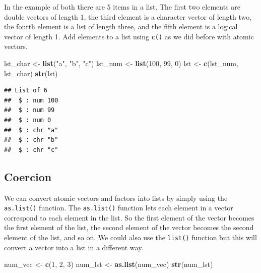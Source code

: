 \documentclass[
]{book}
\newenvironment{Shaded}{\begin{snugshade}}{\end{snugshade}}
\newcommand{\DecValTok}[1]{\textcolor[rgb]{0.00,0.00,0.81}{#1}}
\newcommand{\KeywordTok}[1]{\textcolor[rgb]{0.13,0.29,0.53}{\textbf{#1}}}
\newcommand{\NormalTok}[1]{#1}
\newcommand{\StringTok}[1]{\textcolor[rgb]{0.31,0.60,0.02}{#1}}
\begin{document}
In the example of both there are 5 items in a list. The first two elements are double vectors of length 1, the third element is a character vector of length two, the fourth element is a list of length three, and the fifth element is a logical vector of length 1.
Add elements to a list using \texttt{c()} as we did before with atomic vectors.

\begin{Shaded}
\begin{Highlighting}[]
\NormalTok{lst_char <-}\StringTok{ }\KeywordTok{list}\NormalTok{(}\StringTok{"a"}\NormalTok{, }\StringTok{"b"}\NormalTok{, }\StringTok{"c"}\NormalTok{)}
\NormalTok{lst_num <-}\StringTok{ }\KeywordTok{list}\NormalTok{(}\DecValTok{100}\NormalTok{, }\DecValTok{99}\NormalTok{, }\DecValTok{0}\NormalTok{)}
\NormalTok{lst <-}\StringTok{ }\KeywordTok{c}\NormalTok{(lst_num, lst_char)}
\KeywordTok{str}\NormalTok{(lst)}
\end{Highlighting}
\end{Shaded}

\begin{verbatim}
## List of 6
##  $ : num 100
##  $ : num 99
##  $ : num 0
##  $ : chr "a"
##  $ : chr "b"
##  $ : chr "c"
\end{verbatim}

\hypertarget{coercion-2}{%
\subsection{Coercion}\label{coercion-2}}

We can convert atomic vectors and factors into lists by simply using the \texttt{as.list()} function. The \texttt{as.list()} function lets each element in a vector correspond to each element in the list. So the first element of the vector becomes the first element of the list, the second element of the vector becomes the second element of the list, and so on. We could also use the \texttt{list()} function but this will convert a vector into a list in a different way.

\begin{Shaded}
\begin{Highlighting}[]
\NormalTok{num_vec <-}\StringTok{ }\KeywordTok{c}\NormalTok{(}\DecValTok{1}\NormalTok{, }\DecValTok{2}\NormalTok{, }\DecValTok{3}\NormalTok{)}
\NormalTok{num_lst <-}\StringTok{ }\KeywordTok{as.list}\NormalTok{(num_vec)}
\KeywordTok{str}\NormalTok{(num_lst)}
\end{Highlighting}
\end{Shaded}
\end{document}
